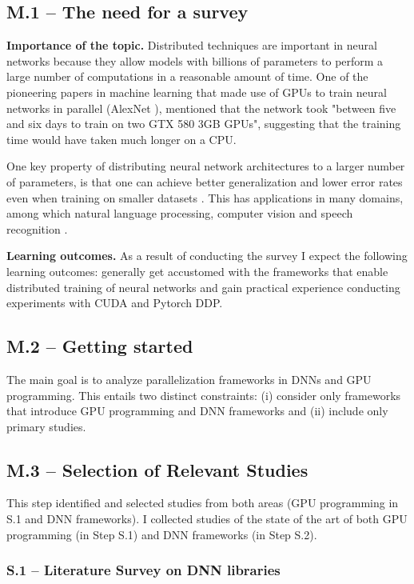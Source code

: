 \subsection{M.1 -- The need for a survey}
\label{sec:need_for_survey}

\textbf{Importance of the topic.}
Distributed techniques are important in neural networks because they allow models with billions of
parameters to perform a large number of computations in a reasonable amount of time. One of the
pioneering papers in machine learning that made use of GPUs to train neural networks in parallel
(AlexNet \cite{krizhevsky_imagenet_2012}), mentioned that the network took "between five and six days to
train on two GTX 580 3GB GPUs", suggesting that the training time would have taken much longer on a
CPU.

One key property of distributing neural network architectures to a larger number of parameters, is
that one can achieve better generalization and lower error rates even when training on smaller
datasets \cite{kaplan_scaling_2020}. This has applications in many domains, among which natural
language processing, computer vision and speech recognition \cite{noauthor_papers_nodate}.

\textbf{Learning outcomes.}
As a result of conducting the survey I expect the following learning outcomes: generally get accustomed
with the frameworks that enable distributed training of neural networks and gain practical experience
conducting experiments with CUDA and Pytorch DDP.

\subsection{M.2 -- Getting started}
\label{sec:research_questions}
The main goal is to analyze parallelization frameworks in DNNs and GPU programming. This entails two distinct
constraints: (i) consider only frameworks that introduce GPU programming and DNN frameworks and (ii) include
only primary studies.

\subsection{M.3 -- Selection of Relevant Studies}
This step identified and selected studies from both areas (GPU programming in S.1 and DNN
frameworks). I collected studies of the state of the art of both GPU programming (in Step S.1) and
DNN frameworks (in Step S.2).

\subsubsection{S.1 -- Literature Survey on DNN libraries}
